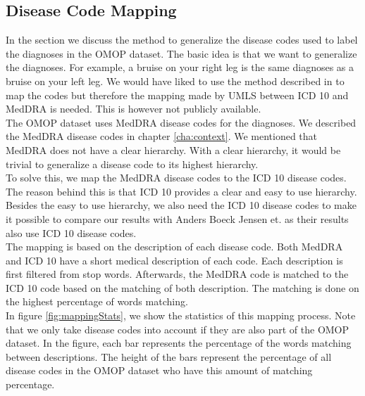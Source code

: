\subsection{Disease Code Mapping}
\label{sec:mapping}

In the section we discuss the method to generalize the disease codes used to label the diagnoses in the OMOP dataset. The basic idea is that we want to generalize the diagnoses. For example, a bruise on your right leg is the same diagnoses as a bruise on your left leg. We would have liked to use the method described in \cite{icd10Mapping:article} to map the codes but therefore the mapping made by UMLS between ICD 10 and MedDRA is needed. This is however not publicly available. \\

The OMOP dataset uses MedDRA disease codes for the diagnoses. We described the MedDRA disease codes in chapter \ref{cha:context}. We mentioned that MedDRA does not have a clear hierarchy. With a clear hierarchy, it would be trivial to generalize a disease code to its highest hierarchy. \\
To solve this, we map the MedDRA disease codes to the ICD 10 disease codes. The reason behind this is that ICD 10 provides a clear and easy to use hierarchy. Besides the easy to use hierarchy, we also need the ICD 10 disease codes to make it possible to compare our results with Anders Boeck Jensen et. \cite{Brunak:article} as their results also use ICD 10 disease codes. \\

The mapping is based on the description of each disease code. Both MedDRA and ICD 10 have a short medical description of each code. Each description is first filtered from stop words. Afterwards, the MedDRA code is matched to the ICD 10 code based on the matching of both description. The matching is done on the highest percentage of words matching. \\

In figure \ref{fig:mappingStats}, we show the statistics of this mapping process. Note that we only take disease codes into account if they are also part of the OMOP dataset. In the figure, each bar represents the percentage of the words matching between descriptions. The height of the bars represent the percentage of all disease codes in the OMOP dataset who have this amount of matching percentage. \\

